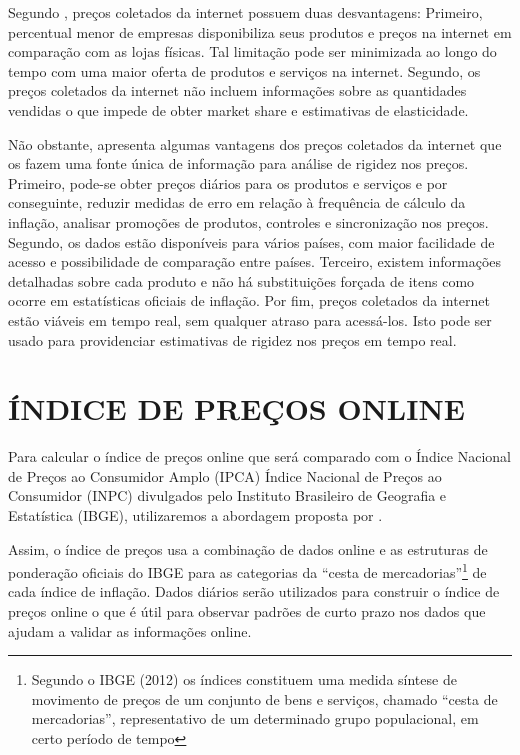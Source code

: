 \documentclass[twoside,a4paper,11pt]{report}
\begin{document}
Segundo \citet{cavallo2010scraped}, preços coletados da internet possuem duas desvantagens: Primeiro, percentual menor de empresas disponibiliza seus produtos e preços na internet em comparação com as lojas físicas. Tal limitação pode ser minimizada ao longo do tempo com uma maior oferta de produtos e serviços na internet. Segundo, os preços coletados da internet não incluem informações sobre as quantidades vendidas o que impede de obter market share e estimativas de elasticidade.

  Não obstante, \citet{cavallo2010scraped} apresenta algumas vantagens dos preços coletados da internet que os fazem uma fonte única de informação para análise de rigidez nos preços. Primeiro, pode-se obter preços diários para os produtos e serviços e por conseguinte, reduzir medidas de erro em relação à frequência de cálculo da inflação, analisar promoções de produtos, controles e sincronização nos preços. Segundo, os dados estão disponíveis para vários países, com maior facilidade de acesso e possibilidade de comparação entre países. Terceiro, existem informações detalhadas sobre cada produto e não há substituições forçada de itens como ocorre em estatísticas oficiais de inflação. Por fim, preços coletados da internet estão viáveis em tempo real, sem qualquer atraso para acessá-los. Isto pode ser usado para providenciar estimativas de rigidez nos preços em tempo real.
  
\section*{ÍNDICE DE PREÇOS ONLINE}
  
  Para calcular o índice de preços online que será comparado com o Índice Nacional de Preços ao Consumidor Amplo (IPCA) Índice Nacional de Preços ao Consumidor (INPC) divulgados pelo Instituto Brasileiro de Geografia e Estatística (IBGE), utilizaremos a abordagem proposta por \citet{cavallo2010scraped}.
  
  Assim, o índice de preços usa a combinação de dados online e as estruturas de ponderação oficiais do IBGE para as categorias da “cesta de mercadorias”\footnote[1]{Segundo o IBGE (2012) os índices constituem uma medida síntese de movimento de preços de um conjunto de bens e serviços, chamado “cesta de mercadorias”, representativo de um determinado grupo populacional, em certo período de tempo} de cada índice de inflação. Dados diários serão utilizados para construir o índice de preços online o que é útil para observar padrões de curto prazo nos dados que ajudam a validar as informações online. 
  
\end{document}
